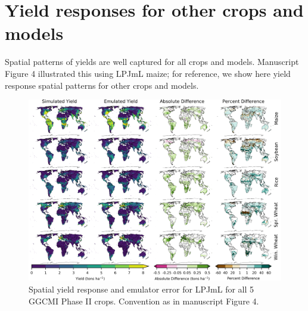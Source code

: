 \documentclass[12pt]{article}
\begin{document}

\clearpage
\section{Yield responses for other crops and models}
\begin{justify}
Spatial patterns of yields are well captured for all crops and models. Manuscript Figure 4 illustrated this using LPJmL maize; for reference, we show here yield response spatial patterns for other crops and models.  

\end{justify}

\begin{figure}[h!]
  \includegraphics[width=\textwidth]{lpjml_grid.png}
  \caption{Spatial yield response and emulator error for LPJmL for all 5 GGCMI Phase II crops. Convention as in manuscript Figure 4.}
  \label{fig:lpjmlrice}
\end{figure}
\end{document}
